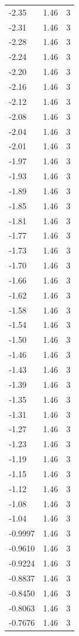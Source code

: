 \begin{longtable}{lrr}
  -2.35 & 1.46 & 3 \\
  -2.31 & 1.46 & 3 \\
  -2.28 & 1.46 & 3 \\
  -2.24 & 1.46 & 3 \\
  -2.20 & 1.46 & 3 \\
  -2.16 & 1.46 & 3 \\
  -2.12 & 1.46 & 3 \\
  -2.08 & 1.46 & 3 \\
  -2.04 & 1.46 & 3 \\
  -2.01 & 1.46 & 3 \\
  -1.97 & 1.46 & 3 \\
  -1.93 & 1.46 & 3 \\
  -1.89 & 1.46 & 3 \\
  -1.85 & 1.46 & 3 \\
  -1.81 & 1.46 & 3 \\
  -1.77 & 1.46 & 3 \\
  -1.73 & 1.46 & 3 \\
  -1.70 & 1.46 & 3 \\
  -1.66 & 1.46 & 3 \\
  -1.62 & 1.46 & 3 \\
  -1.58 & 1.46 & 3 \\
  -1.54 & 1.46 & 3 \\
  -1.50 & 1.46 & 3 \\
  -1.46 & 1.46 & 3 \\
  -1.43 & 1.46 & 3 \\
  -1.39 & 1.46 & 3 \\
  -1.35 & 1.46 & 3 \\
  -1.31 & 1.46 & 3 \\
  -1.27 & 1.46 & 3 \\
  -1.23 & 1.46 & 3 \\
  -1.19 & 1.46 & 3 \\
  -1.15 & 1.46 & 3 \\
  -1.12 & 1.46 & 3 \\
  -1.08 & 1.46 & 3 \\
  -1.04 & 1.46 & 3 \\
  -0.9997 & 1.46 & 3 \\
  -0.9610 & 1.46 & 3 \\
  -0.9224 & 1.46 & 3 \\
  -0.8837 & 1.46 & 3 \\
  -0.8450 & 1.46 & 3 \\
  -0.8063 & 1.46 & 3 \\
  -0.7676 & 1.46 & 3 \\

\end{longtable}

